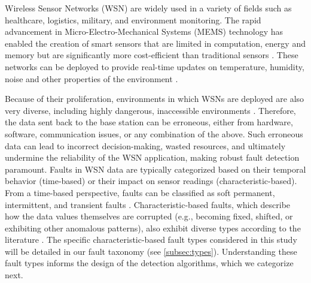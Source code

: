 Wireless Sensor Networks (WSN) are widely used in a variety of fields such as healthcare, logistics, military, and environment monitoring. The rapid advancement in Micro-Electro-Mechanical Systems (MEMS) technology has enabled the creation of smart sensors that are limited in computation, energy and memory but are significantly more cost-efficient than traditional sensors \cite{Yick2008, Chai2020, Hussain2021}. These networks can be deployed to provide real-time updates on temperature, humidity, noise and other properties of the environment \cite{Yick2008, Chai2020, Ullo2020}.

Because of their proliferation, environments in which WSNs are deployed are also very diverse, including highly dangerous, inaccessible environments \cite{Prasad2023}. Therefore, the data sent back to the base station can be erroneous, either from hardware, software, communication issues, or any combination of the above. Such erroneous data can lead to incorrect decision-making, wasted resources, and ultimately undermine the reliability of the WSN application, making robust fault detection paramount. Faults in WSN data are typically categorized based on their temporal behavior (time-based) or their impact on sensor readings (characteristic-based). From a time-based perspective, faults can be classified as soft permanent, intermittent, and transient faults \cite{Prasad2023}. Characteristic-based faults, which describe how the data values themselves are corrupted (e.g., becoming fixed, shifted, or exhibiting other anomalous patterns), also exhibit diverse types according to the literature \cite{Shi2024, Saeed2021, Ni2009, Hasan2024}. The specific characteristic-based fault types considered in this study will be detailed in our fault taxonomy (see \ref{subsec:types}). Understanding these fault types informs the design of the detection algorithms, which we categorize next.

